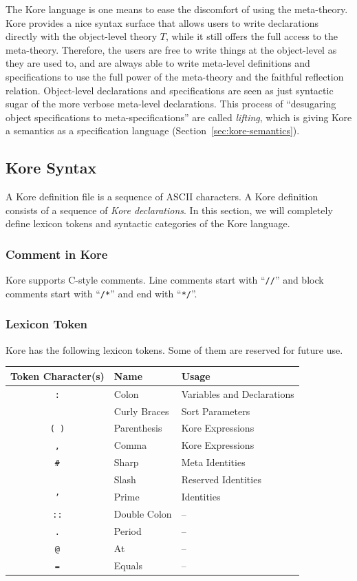 \documentclass[UTF8,11pt]{article}
\theoremstyle{plain}
\theoremstyle{definition}
\theoremstyle{remark}
\newcommand{\sharpsymbol}{\#}
\newcommand{\slashsymbol}{\symbol{92}}
\begin{document}
The Kore language is one means to ease the discomfort of using the meta-theory.
Kore provides a nice syntax surface that allows users to write declarations 
directly with the object-level theory $T$, while it still offers the full 
access to the meta-theory.
Therefore, the users are free to write things at the object-level as they are 
used to, and are always able to write meta-level definitions and specifications 
to use the full power of the meta-theory and the faithful reflection relation.
Object-level declarations and specifications are seen as just syntactic sugar 
of the more verbose meta-level declarations.
This process of ``desugaring object specifications to meta-specifications'' are 
called \emph{lifting}, which is giving Kore a semantics as a specification 
language (Section~\ref{sec:kore-semantics}).

\subsection{Kore Syntax}

A Kore definition file is a sequence of ASCII characters.
A Kore definition consists of a sequence of \emph{Kore declarations}.
In this section, we will completely define lexicon tokens and syntactic 
categories of the 
Kore language.

\subsubsection{Comment in Kore}
Kore supports C-style comments.
Line comments start with ``\verb|//|'' and block comments start with 
``\verb|/*|'' and end with ``\verb|*/|''.

\subsubsection{Lexicon Token}
Kore has the following lexicon tokens.
Some of them are reserved for future use.
\begin{center}
	\begin{tabular}{c|l|l}
		\textrm{Token Character(s)} & \textrm{Name} & \textrm{Usage}
		\\\hline
		\texttt{:} & Colon & Variables and Declarations
		\\
		\texttt{\string{ \string}} & Curly Braces & Sort Parameters
		\\
		\texttt{( )} & Parenthesis & Kore Expressions
		\\
		\texttt{,} & Comma & Kore Expressions
		\\
        \texttt{\sharpsymbol} & Sharp & Meta Identities
        \\
        \texttt{\slashsymbol} & Slash & Reserved Identities
        \\
        \texttt{'} & Prime & Identities
        \\
        \texttt{::} & Double Colon & --
        \\
		\texttt{.} & Period & --
		\\
		\texttt{@} & At & --
		\\
		\texttt{=} & Equals & --
	\end{tabular}
\end{center}
\end{document}
